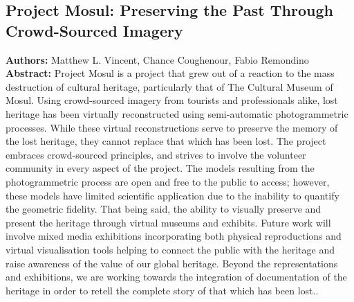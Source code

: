 \subsection{Project Mosul: Preserving the Past Through Crowd-Sourced Imagery}

\textbf{Authors:} Matthew L. Vincent,  Chance Coughenour,  Fabio Remondino
\\
\textbf{Abstract:} Project Mosul is a project that grew out of a reaction to the mass destruction of cultural heritage, particularly that of The Cultural Museum of Mosul. Using crowd-sourced imagery from tourists and professionals alike, lost heritage has been virtually reconstructed using semi-automatic photogrammetric processes. While these virtual reconstructions serve to preserve the memory of the lost heritage, they cannot replace that which has been lost. The project embraces crowd-sourced principles, and strives to involve the volunteer community in every aspect of the project. The models resulting from the photogrammetric process are open and free to the public to access; however, these models have limited scientific application due to the inability to quantify the geometric fidelity. That being said, the ability to visually preserve and present the heritage through virtual museums and exhibits. Future work will involve mixed media exhibitions incorporating both physical reproductions and virtual visualisation tools helping to connect the public with the heritage and raise awareness of the value of our global heritage. Beyond the representations and exhibitions, we are working towards the integration of documentation of the heritage in order to retell the complete story of that which has been lost..

